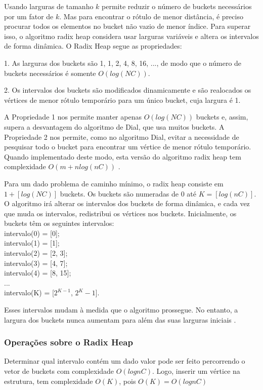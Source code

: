 Usando larguras de tamanho $k$ permite reduzir o número de buckets necessários por um fator de $k$.
Mas para encontrar o rótulo de menor distância, é preciso procurar todos os elementos no bucket não vazio de menor índice.
Para superar isso, o algoritmo radix heap considera usar larguras variáveis e altera os intervalos de forma dinâmica. 
O Radix Heap segue as propriedades:

1. As larguras dos buckets são 1, 1, 2, 4, 8, 16, ..., de modo que o número de buckets necessários é somente $O(log(NC))$.

2.  Os intervalos dos buckets são modificados dinamicamente e são realocados os vértices de menor rótulo temporário
para um único bucket, cuja largura é 1.

A Propriedade 1 nos permite manter apenas $O(log(NC))$ buckets e, assim, supera a desvantagem do algoritmo
de Dial, que usa muitos buckets.
A Propriedade 2 nos permite, como no algoritmo Dial, evitar a necessidade de 
pesquisar todo o bucket para encontrar um vértice de menor rótulo temporário. Quando implementado deste modo, esta 
versão do algoritmo radix heap tem complexidade $O(m + nlog(nC))$ \cite{bookahuja}.

Para um dado problema de caminho mínimo, o radix heap consiste em $1 + [log(NC)]$ buckets.
Os buckets são numeradas de $0$ até $K = [log(nC)]$.
O algoritmo irá alterar os intervalos dos buckets de forma dinâmica, e cada vez que muda os intervalos,
redistribui os vértices nos buckets. Inicialmente, os buckets têm os seguintes intervalos:\\
intervalo(0) = [0];\\
intervalo(1) = [1];\\
intervalo(2) = [2, 3];\\
intervalo(3) = [4, 7];\\
intervalo(4) = [8, 15];\\
...\\
intervalo(K) = [$2^{K - 1}$, $2^K - 1$].

Esses intervalos mudam à medida que o algoritmo prossegue. No entanto, a largura dos buckets nunca aumentam
para além das suas larguras iniciais \cite{bookahuja}.

\subsubsection{Operações sobre o Radix Heap}
Determinar qual intervalo contém um dado valor pode ser feito percorrendo o vetor de buckets com complexidade $O(lognC)$.
Logo, inserir um vértice na estrutura, tem complexidade $O(K)$, pois $O(K) = O(lognC)$

